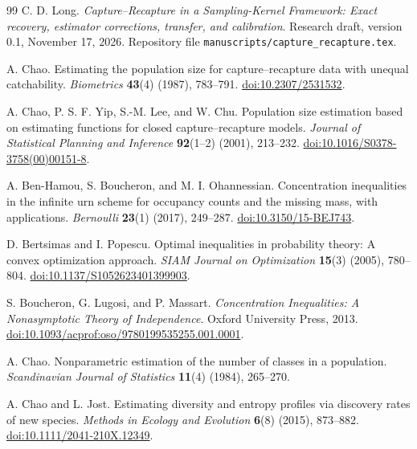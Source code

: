 \documentclass[11pt]{article}
\numberwithin{equation}{section}
\theoremstyle{definition}
\theoremstyle{remark}
\begin{document}
\begingroup\small
\begin{thebibliography}{99}
\setlength{\itemsep}{3pt}\setlength{\parskip}{0pt}
C. D. Long. \emph{Capture--Recapture in a Sampling-Kernel Framework:
Exact recovery, estimator corrections, transfer, and calibration}.
Research draft, version 0.1, November 17, 2026.
Repository file \texttt{manuscripts/capture\_recapture.tex}.

A. Chao. Estimating the population size for capture--recapture data with unequal catchability.
\emph{Biometrics} \textbf{43}(4) (1987), 783--791.
\href{https://doi.org/10.2307/2531532}{doi:10.2307/2531532}.

A. Chao, P. S. F. Yip, S.-M. Lee, and W. Chu.
Population size estimation based on estimating functions for closed capture--recapture models.
\emph{Journal of Statistical Planning and Inference} \textbf{92}(1--2) (2001), 213--232.
\href{https://doi.org/10.1016/S0378-3758(00)00151-8}{doi:10.1016/S0378-3758(00)00151-8}.

A. Ben-Hamou, S. Boucheron, and M. I. Ohannessian.
Concentration inequalities in the infinite urn scheme for occupancy counts and the missing mass, with applications.
\emph{Bernoulli} \textbf{23}(1) (2017), 249--287.
\href{https://doi.org/10.3150/15-BEJ743}{doi:10.3150/15-BEJ743}.

D. Bertsimas and I. Popescu.
Optimal inequalities in probability theory: A convex optimization approach.
\emph{SIAM Journal on Optimization} \textbf{15}(3) (2005), 780--804.
\href{https://doi.org/10.1137/S1052623401399903}{doi:10.1137/S1052623401399903}.

S. Boucheron, G. Lugosi, and P. Massart.
\emph{Concentration Inequalities: A Nonasymptotic Theory of Independence}.
Oxford University Press, 2013.
\href{https://doi.org/10.1093/acprof:oso/9780199535255.001.0001}{doi:10.1093/acprof:oso/9780199535255.001.0001}.

A. Chao.
Nonparametric estimation of the number of classes in a population.
\emph{Scandinavian Journal of Statistics} \textbf{11}(4) (1984), 265--270.

A. Chao and L. Jost.
Estimating diversity and entropy profiles via discovery rates of new species.
\emph{Methods in Ecology and Evolution} \textbf{6}(8) (2015), 873--882.
\href{https://doi.org/10.1111/2041-210X.12349}{doi:10.1111/2041-210X.12349}.


\end{thebibliography}
\end{document}
